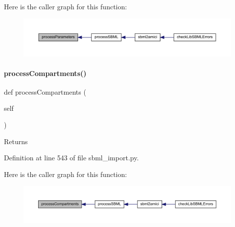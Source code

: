 Here is the caller graph for this function\+:
\nopagebreak
\begin{figure}[H]
\begin{center}
\leavevmode
\includegraphics[width=350pt]{classamici_1_1sbml__import_1_1_sbml_importer_a26d072114efe1fec695cc4030c64e1ea_icgraph}
\end{center}
\end{figure}
\mbox{\label{classamici_1_1sbml__import_1_1_sbml_importer_a526afc71a857e7fdefb4754fc2f93882}} 
\paragraph{\texorpdfstring{process\+Compartments()}{processCompartments()}}
{\footnotesize\ttfamily def process\+Compartments (\begin{DoxyParamCaption}\item[{}]{self }\end{DoxyParamCaption})}

\begin{DoxyReturn}{Returns}

\end{DoxyReturn}


Definition at line 543 of file sbml\+\_\+import.\+py.

Here is the caller graph for this function\+:
\nopagebreak
\begin{figure}[H]
\begin{center}
\leavevmode
\includegraphics[width=350pt]{classamici_1_1sbml__import_1_1_sbml_importer_a526afc71a857e7fdefb4754fc2f93882_icgraph}
\end{center}
\end{figure}
\mbox{\label{classamici_1_1sbml__import_1_1_sbml_importer_adbdd8e9af99679633109829d94b3fd3e}} 
